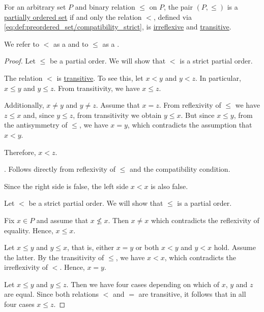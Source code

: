 \begin{proposition}\label{thm:strict_partial_order}
  For an arbitrary set \( P \) and binary relation \( \leq \) on \( P \), the pair \( (P, \leq) \) is a \hyperref[def:partially_ordered_set]{partially ordered set} if and only the relation \( < \), defined via \eqref{eq:def:preordered_set/compatibility_strict}, is \hyperref[def:binary_relation/irreflexive]{irreflexive} and \hyperref[def:binary_relation/transitive]{transitive}.
\end{proposition}
\begin{comments}
  \item We refer to \( < \) as a  and to \( \leq \) as a .
\end{comments}
\begin{proof}
  \SufficiencySubProof Let \( \leq \) be a partial order. We will show that \( < \) is a strict partial order.

   The relation \( < \) is \hyperref[def:binary_relation/transitive]{transitive}. To see this, let \( x < y \) and \( y < z \). In particular, \( x \leq y \) and \( y \leq z \). From transitivity, we have \( x \leq z \).

  Additionally, \( x \neq y \) and \( y \neq z \). Assume that \( x = z \). From reflexivity of \( \leq \) we have \( z \leq x \) and, since \( y \leq z \), from transitivity we obtain \( y \leq x \). But since \( x \leq y \), from the antisymmetry of \( \leq \), we have \( x = y \), which contradicts the assumption that \( x < y \).

  Therefore, \( x < z \).

  . Follows directly from reflexivity of \( \leq \) and the compatibility condition.

  Since the right side is false, the left side \( x < x \) is also false.

  \NecessitySubProof Let \( < \) be a strict partial order. We will show that \( \leq \) is a partial order.

   Fix \( x \in P \) and assume that \( x \not\leq x \). Then \( x \neq x \) which contradicts the reflexivity of equality. Hence, \( x \leq x \).

   Let \( x \leq y \) and \( y \leq x \), that is, either \( x = y \) or both \( x < y \) and \( y < x \) hold. Assume the latter. By the transitivity of \( \leq \), we have \( x < x \), which contradicts the irreflexivity of \( < \). Hence, \( x = y \).

   Let \( x \leq y \) and \( y \leq z \). Then we have four cases depending on which of \( x \), \( y \) and \( z \) are equal. Since both relations \( < \) and \( = \) are transitive, it follows that in all four cases \( x \leq z \).
\end{proof}

